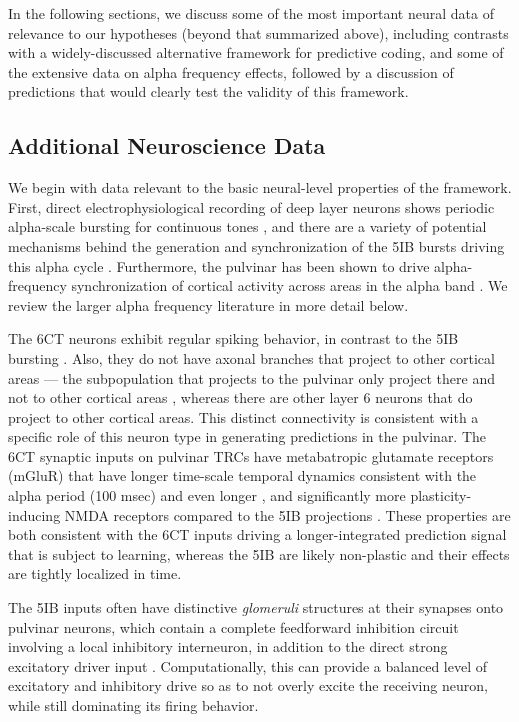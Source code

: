 \documentclass[11pt,twoside]{article}
\newif\myifpdf
\begin{document}
In the following sections, we discuss some of the most important neural data of relevance to our hypotheses (beyond that summarized above), including contrasts with a widely-discussed alternative framework for predictive coding,  and some of the extensive data on alpha frequency effects, followed by a discussion of predictions that would clearly test the validity of this framework.

\subsection{Additional Neuroscience Data}

We begin with data relevant to the basic neural-level properties of the framework.  First, direct electrophysiological recording of deep layer neurons shows periodic alpha-scale bursting for continuous tones \citep{LuczakBarthoHarris13}, and there are a variety of potential mechanisms behind the generation and synchronization of the 5IB bursts driving this alpha cycle \citep{ConnorsGutnickPrince82,SilvaAmitaiConnors91,FranceschettiGuatteoPanzicaEtAl95}.  Furthermore, the pulvinar has been shown to drive alpha-frequency synchronization of cortical activity across areas in the alpha band \citep{SaalmannPinskWangEtAl12}.  We review the larger alpha frequency literature in more detail below.

The 6CT neurons exhibit regular spiking behavior, in contrast to the 5IB bursting \citep{Thomson10,ThomsonLamy07}. Also, they do not have axonal branches that project to other cortical areas --- the subpopulation that projects to the pulvinar only project there and not to other cortical areas \citep{PetrofViaeneSherman12}, whereas there are other layer 6 neurons that do project to other cortical areas.  This distinct connectivity is consistent with a specific role of this neuron type in generating predictions in the pulvinar.   The 6CT synaptic inputs on pulvinar TRCs have metabatropic glutamate receptors (mGluR) that have longer time-scale temporal dynamics consistent with the alpha period (100 msec) and even longer \citep{Sherman14}, and significantly more plasticity-inducing NMDA receptors compared to the 5IB projections \citep{UsreySherman18}.  These properties are both consistent with the 6CT inputs driving a longer-integrated prediction signal that is subject to learning, whereas the 5IB are likely non-plastic and their effects are tightly localized in time. 

The 5IB inputs often have distinctive \emph{glomeruli} structures at their synapses onto pulvinar neurons, which contain a complete feedforward inhibition circuit involving a local inhibitory interneuron, in addition to the direct strong excitatory driver input \citep{WilsonBoseShermanEtAl84}.  Computationally, this can provide a balanced level of excitatory and inhibitory drive so as to not overly excite the receiving neuron, while still dominating its firing behavior.
\end{document}
